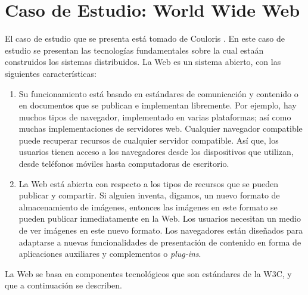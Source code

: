 
\chapter{Caso de Estudio: World Wide Web }
\label{ch:caso-estudio}
El caso de estudio que se presenta est\'a tomado de Couloris . En este caso de estudio se presentan las tecnolog\'ias fundamentales sobre la cual esta\'an construidos los sistemas distribuidos.
La Web es un sistema abierto, con las siguientes caracter\'isticas: 
\begin{enumerate}
	\item Su funcionamiento est\'a 	basado en estándares de comunicación y contenido o en documentos que se  	publican e implementan libremente. Por ejemplo, hay muchos tipos de navegador,  implementado en varias plataformas; as\'i como   muchas implementaciones de servidores web. Cualquier navegador compatible puede recuperar recursos de cualquier servidor compatible. As\'i que, los usuarios tienen acceso a los navegadores desde   los dispositivos que utilizan,
	desde teléfonos móviles hasta computadoras de escritorio.
	
	\item La Web está abierta con respecto a los tipos de \gls{recursos} que se pueden publicar y compartir. Si alguien inventa, digamos, un nuevo formato de almacenamiento de imágenes, entonces  las imágenes en este formato se pueden publicar inmediatamente en la Web. Los usuarios necesitan un medio de ver imágenes en este nuevo formato. Los navegadores están diseñados para adaptarse a nuevas funcionalidades de presentación de contenido en forma de aplicaciones auxiliares y complementos o \textit{plug-ins}.
	
\end{enumerate}

La Web se basa en  componentes tecnológicos que son  estándares de la W3C,  y que a continuaci\'on se describen.

